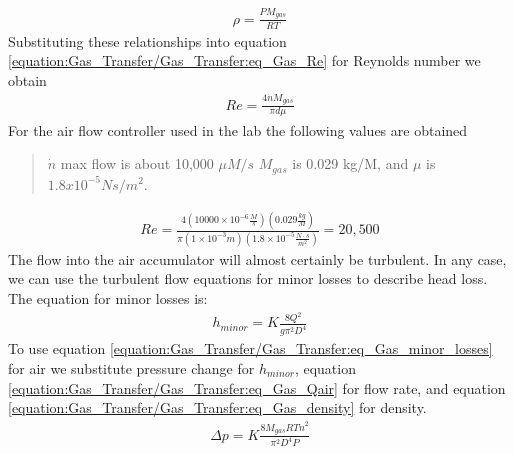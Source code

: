 \documentclass[letterpaper,10pt,english]{sphinxmanual}
\begin{document}
\begin{equation}\label{equation:Gas_Transfer/Gas_Transfer:eq_Gas_density}
\begin{split}\rho =\frac{PM_{gas} }{RT}\end{split}
\end{equation}
Substituting these relationships into equation \eqref{equation:Gas_Transfer/Gas_Transfer:eq_Gas_Re} for Reynolds number we obtain
\begin{equation}\label{equation:Gas_Transfer/Gas_Transfer:Gas_Transfer/Gas_Transfer:11}
\begin{split}{Re}=\frac{4\dot{n}M_{gas} }{\pi d\mu }\end{split}
\end{equation}
For the air flow controller used in the lab the following values are obtained
\begin{quote}

\(\dot{n}\) max flow is about 10,000 \(\mu M/s\) \(M_{gas}\) is 0.029 kg/M, and \(\mu\) is \(1.8 x 10^{-5} Ns/m^2\).
\end{quote}
\begin{equation}\label{equation:Gas_Transfer/Gas_Transfer:Gas_Transfer/Gas_Transfer:12}
\begin{split}{Re}=\frac{4\left(10000\times 10^{-6} \frac{M}{s} \right)\left(0.029\frac{kg}{M} \right)}{\pi \left(1\times 10^{-3} m\right)\left(1.8\times 10^{-5} \frac{N\cdot s}{m^{2} } \right)} =20,500\end{split}
\end{equation}
The flow into the air accumulator will almost certainly be turbulent. In any case, we can use the turbulent flow equations for minor losses to describe head loss. The equation for minor losses is:
\begin{equation}\label{equation:Gas_Transfer/Gas_Transfer:eq_Gas_minor_losses}
\begin{split}h_{minor} =K\frac{8Q^{2} }{g\pi ^{2} D^{4} }\end{split}
\end{equation}
To use equation \eqref{equation:Gas_Transfer/Gas_Transfer:eq_Gas_minor_losses} for air we substitute pressure change for \(h_{minor}\), equation \eqref{equation:Gas_Transfer/Gas_Transfer:eq_Gas_Qair} for flow rate, and equation \eqref{equation:Gas_Transfer/Gas_Transfer:eq_Gas_density} for density.
\begin{equation}\label{equation:Gas_Transfer/Gas_Transfer:eq_Gas_minor_losses_for_gas}
\begin{split}\Delta p=K\frac{8M_{gas} RT\dot{n}^{2} }{\pi ^{2} D^{4} P}\end{split}
\end{equation}
\end{document}
